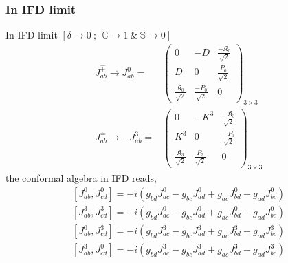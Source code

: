 \documentclass[]{article}
\numberwithin{equation}{section}
\begin{document}
{{\subsubsection{In IFD limit}
In IFD limit $[\delta\longrightarrow0~;~~\mathbb{C}\longrightarrow1~\&~\mathbb{S}\longrightarrow0]$
\begin{align}
  J^{\hat{+}}_{ab}\longrightarrow J^{0}_{ab}=&
  \begin{pmatrix}
  0&-D&\frac{-\mathfrak{K}_0}{\sqrt{2}}\\
  D&0&\frac{P_0}{\sqrt{2}}\\
    \frac{\mathfrak{K}_0}{\sqrt{2}}&\frac{-P_0}{\sqrt{2}}&0  
  \end{pmatrix}_{3\times3} \\
  J^{\hat{-}}_{ab}\longrightarrow -J^{3}_{ab}=&
  \begin{pmatrix}
  0&-K^3&\frac{-\mathfrak{K}_3}{\sqrt{2}}\\
  K^3&0&\frac{-P_3}{\sqrt{2}}\\
    \frac{\mathfrak{K}_3}{\sqrt{2}}&\frac{P_3}{\sqrt{2}}&0  
  \end{pmatrix}_{3\times3}
\end{align}
the conformal algebra in IFD reads,
\begin{align}
      \left[J^{0}_{{a}{b}},J^{0}_{{c}{d}}\right]=-i\left(g_{{b}{d}}J^{0}_{{a}{c}}-g_{{b}{c}}J^{0}_{{a}{d}}+g_{{a}{c}}J^{0}_{{b}{d}}-g_{{a}{d}}J^{0}_{{b}{c}}\right)\\
      \left[J^{3}_{{a}{b}},J^{3}_{{c}{d}}\right]=-i\left(g_{{b}{d}}J^{0}_{{a}{c}}-g_{{b}{c}}J^{0}_{{a}{d}}+g_{{a}{c}}J^{0}_{{b}{d}}-g_{{a}{d}}J^{0}_{{b}{c}}\right)\\
      \left[J^{0}_{{a}{b}},J^{3}_{{c}{d}}\right]=-i\left(g_{{b}{d}}J^{3}_{{a}{c}}-g_{{b}{c}}J^{3}_{{a}{d}}+g_{{a}{c}}J^{3}_{{b}{d}}-g_{{a}{d}}J^{3}_{{b}{c}}\right)\\
      \left[J^{3}_{{a}{b}},J^{0}_{{c}{d}}\right]=-i\left(g_{{b}{d}}J^{3}_{{a}{c}}-g_{{b}{c}}J^{3}_{{a}{d}}+g_{{a}{c}}J^{3}_{{b}{d}}-g_{{a}{d}}J^{3}_{{b}{c}}\right)
\end{align}
  \begin{table}[h!]
\centering
\caption{\label{tabelinterpolationifd}$1+1$ conformal algebra in IFD}
\end{table}}}
\end{document}
